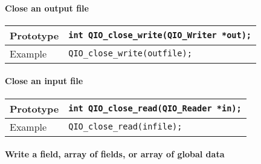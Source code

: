 \documentclass{article}
\begin{document}
\paragraph{Close an output file}

\begin{flushleft}
  \begin{tabular}{|l|l|}
  \hline
  Prototype      & \verb|int QIO_close_write(QIO_Writer *out);| \\
\hline
  Example  & \verb|QIO_close_write(outfile);|\\
   \hline
 \end{tabular}
\end{flushleft}

\paragraph{Close an input file}

\begin{flushleft}
  \begin{tabular}{|l|l|}
  \hline
  Prototype      & \verb|int QIO_close_read(QIO_Reader *in);| \\
\hline
  Example  & \verb|QIO_close_read(infile);|\\
   \hline
 \end{tabular}
\end{flushleft}


\paragraph{Write a field, array of fields, or array of global data}
\end{document}
